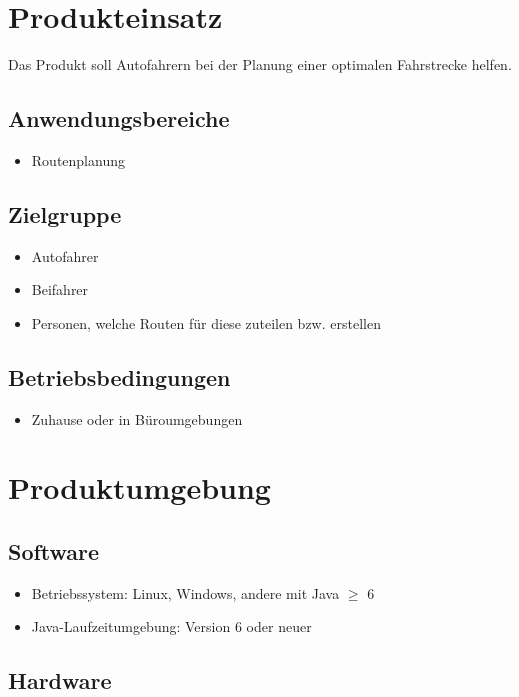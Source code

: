 \documentclass[a4paper, 11pt]{article}
\begin{document}
\section{Produkteinsatz}

Das Produkt soll Autofahrern bei der Planung einer optimalen Fahrstrecke helfen.

\subsection{Anwendungsbereiche}
\begin{itemize}
\item Routenplanung
\end{itemize}

\subsection{Zielgruppe}
\begin{itemize}
\item Autofahrer
\item Beifahrer
\item Personen, welche Routen für diese zuteilen bzw. erstellen
\end{itemize}

\subsection{Betriebsbedingungen}
\begin{itemize}
\item Zuhause oder in Büroumgebungen
\end{itemize}

\section{Produktumgebung}

\subsection{Software}

\begin{itemize}
\item Betriebssystem: Linux, Windows, andere mit Java $\geq$ 6
\item Java-Laufzeitumgebung: Version 6 oder neuer
\end{itemize}

\subsection{Hardware}
\end{document}
